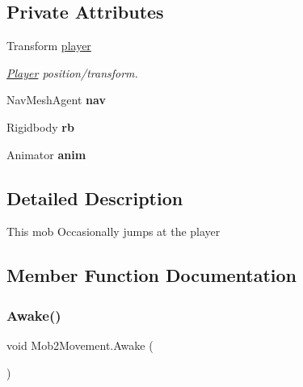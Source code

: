 \subsection*{Private Attributes}
\begin{DoxyCompactItemize}
\item 
\mbox{\label{class_mob2_movement_adba86d6852cafaebc8c24d03c5060a79}} 
Transform \hyperlink{class_mob2_movement_adba86d6852cafaebc8c24d03c5060a79}{player}
\begin{DoxyCompactList}\small\item\em \hyperlink{class_player}{Player} position/transform. \end{DoxyCompactList}\item 
\mbox{\label{class_mob2_movement_a9d18fd4ab57a4b254e41572a5e51221a}} 
Nav\+Mesh\+Agent {\bfseries nav}
\item 
\mbox{\label{class_mob2_movement_a277e1f62e34bfe7d2992de75b515c15d}} 
Rigidbody {\bfseries rb}
\item 
\mbox{\label{class_mob2_movement_ab46f0903ccfe3b8a8a8d958cb9891bc8}} 
Animator {\bfseries anim}
\end{DoxyCompactItemize}


\subsection{Detailed Description}
This mob Occasionally jumps at the player 

\subsection{Member Function Documentation}
\mbox{\label{class_mob2_movement_a1caeb0925d5a847a3458ba312c35adb9}} 
\subsubsection{\texorpdfstring{Awake()}{Awake()}}
{\footnotesize\ttfamily void Mob2\+Movement.\+Awake (\begin{DoxyParamCaption}{ }\end{DoxyParamCaption})\hspace{0.3cm}{\ttfamily [private]}}

